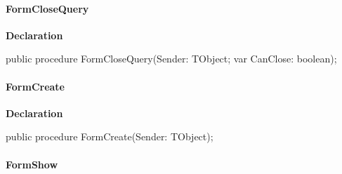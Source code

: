 \documentclass{report}
\newif\ifpdf
\begin{document}
\paragraph*{FormCloseQuery}\hspace*{\fill}

\label{dgunit.TDGForm-FormCloseQuery}
\begin{list}{}{
\setlength{\itemindent}{0cm}
\setlength{\listparindent}{0cm}
\setlength{\leftmargin}{\evensidemargin}
\addtolength{\leftmargin}{\tmplength}
\settowidth{\labelsep}{X}
\addtolength{\leftmargin}{\labelsep}
\setlength{\labelwidth}{\tmplength}
}
\item[\textbf{Declaration}\hfill]
\ifpdf
\begin{flushleft}
\fi
\begin{ttfamily}
public procedure FormCloseQuery(Sender: TObject; var CanClose: boolean);\end{ttfamily}

\ifpdf
\end{flushleft}
\fi

\end{list}
\paragraph*{FormCreate}\hspace*{\fill}

\label{dgunit.TDGForm-FormCreate}
\begin{list}{}{
\setlength{\itemindent}{0cm}
\setlength{\listparindent}{0cm}
\setlength{\leftmargin}{\evensidemargin}
\addtolength{\leftmargin}{\tmplength}
\settowidth{\labelsep}{X}
\addtolength{\leftmargin}{\labelsep}
\setlength{\labelwidth}{\tmplength}
}
\item[\textbf{Declaration}\hfill]
\ifpdf
\begin{flushleft}
\fi
\begin{ttfamily}
public procedure FormCreate(Sender: TObject);\end{ttfamily}

\ifpdf
\end{flushleft}
\fi

\end{list}
\paragraph*{FormShow}\hspace*{\fill}
\end{document}
